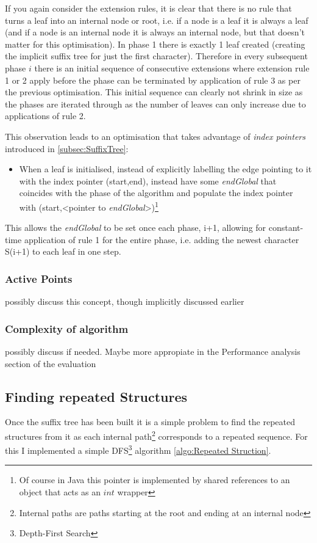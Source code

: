 \documentclass[12pt,twoside,notitlepage]{report}
\begin{document}
					If you again consider the extension rules, it is clear that there is no rule that turns a leaf into an internal node or root, i.e. if a node is a leaf it is always a leaf (and if a node is an internal node it is always an internal node, but that doesn't matter for this optimisation). In phase 1 there is exactly 1 leaf created (creating the implicit suffix tree for just the first character). Therefore in every subsequent phase $i$ there is an initial sequence of consecutive extensions where extension rule 1 or 2 apply before the phase can be terminated by application of rule 3 as per the previous optimisation. This initial sequence can clearly not shrink in size as the phases are iterated through as the number of leaves can only increase due to applications of rule 2. 
					
					This observation leads to an optimisation that takes advantage of \emph{index pointers} introduced in \ref{subsec:SuffixTree}:
					\begin{itemize}
						\item{When a leaf is initialised, instead of explicitly labelling the edge pointing to it with the index pointer (start,end), instead have some \emph{endGlobal} that coincides with the phase of the algorithm and populate the index pointer with (start,<pointer to \emph{endGlobal}>)\footnote{Of course in Java this pointer is implemented by shared references to an object that acts as an $int$ wrapper}}
					\end{itemize}
					This allows the \emph{endGlobal} to be set once each phase, i+1, allowing for constant-time application of rule 1 for the entire phase, i.e. adding the newest character S(i+1) to each leaf in one step.
					
					\subsubsection{Active Points}
					possibly discuss this concept, though implicitly discussed earlier
					\subsubsection{Complexity of algorithm}
					possibly discuss if needed. Maybe more appropiate in the Performance analysis section of the evaluation
			\subsection{Finding repeated Structures}\label{subsec:Finding repeated Structures}
			Once the suffix tree has been built it is a simple problem to find the repeated structures from it as each internal path\footnote{Internal paths are paths starting at the root and ending at an internal node} corresponds to a repeated sequence. For this I implemented a simple DFS\footnote{Depth-First Search} algorithm \ref{algo:Repeated Struction}.
			
\end{document}
